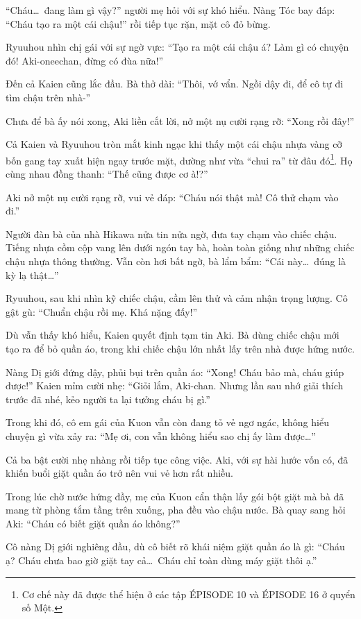 \documentclass[../main.tex]{subfiles}
\begin{document}
``Cháu\dots\ đang làm gì vậy?'' người mẹ hỏi với sự khó hiểu. Nàng Tóc bay đáp: ``Cháu tạo ra một cái chậu!'' rồi tiếp tục rặn, mặt cô đỏ bừng.

Ryuuhou nhìn chị gái với sự ngờ vực: ``Tạo ra một cái chậu á? Làm gì có chuyện đó! Aki-oneechan, đừng có đùa nữa!''

Đến cả Kaien cũng lắc đầu. Bà thở dài: ``Thôi, vớ vẩn. Ngồi dậy đi, để cô tự đi tìm chậu trên nhà-''

Chưa để bà ấy nói xong, Aki liền cắt lời, nở một nụ cười rạng rỡ: ``Xong rồi đây!''

Cả Kaien và Ryuuhou tròn mắt kinh ngạc khi thấy một cái chậu nhựa vàng cỡ bốn gang tay xuất hiện ngay trước mặt, dường như vừa ``chui ra'' từ đâu đó\footnote{Cơ chế này đã được thể hiện ở các tập {\flaregothic ÉPISODE 10} và {\flaregothic ÉPISODE 16} ở quyển số Một.}. Họ cùng nhau đồng thanh: ``Thế cũng được cơ à!?''

Aki nở một nụ cười rạng rỡ, vui vẻ đáp: ``Cháu nói thật mà! Cô thử chạm vào đi.''

Người đàn bà của nhà Hikawa nửa tin nửa ngờ, đưa tay chạm vào chiếc chậu. Tiếng nhựa cồm cộp vang lên dưới ngón tay bà, hoàn toàn giống như những chiếc chậu nhựa thông thường. Vẫn còn hơi bất ngờ, bà lẩm bẩm: ``Cái này\dots\ đúng là kỳ lạ thật\dots''

Ryuuhou, sau khi nhìn kỹ chiếc chậu, cầm lên thử và cảm nhận trọng lượng. Cô gật gù: ``Chuẩn chậu rồi mẹ. Khá nặng đấy!''

Dù vẫn thấy khó hiểu, Kaien quyết định tạm tin Aki. Bà dùng chiếc chậu mới tạo ra để bỏ quần áo, trong khi chiếc chậu lớn nhất lấy trên nhà được hứng nước.

Nàng Dị giới đứng dậy, phủi bụi trên quần áo: ``Xong! Cháu bảo mà, cháu giúp được!'' Kaien mỉm cười nhẹ: ``Giỏi lắm, Aki-chan. Nhưng lần sau nhớ giải thích trước đã nhé, kẻo người ta lại tưởng cháu bị gì.''

Trong khi đó, cô em gái của Kuon vẫn còn đang tỏ vẻ ngơ ngác, không hiểu chuyện gì vừa xảy ra: ``Mẹ ơi, con vẫn không hiểu sao chị ấy làm được\dots''

Cả ba bật cười nhẹ nhàng rồi tiếp tục công việc. Aki, với sự hài hước vốn có, đã khiến buổi giặt quần áo trở nên vui vẻ hơn rất nhiều.

Trong lúc chờ nước hứng đầy, mẹ của Kuon cẩn thận lấy gói bột giặt mà bà đã mang từ phòng tắm tầng trên xuống, pha đều vào chậu nước. Bà quay sang hỏi Aki: ``Cháu có biết giặt quần áo không?''

Cô nàng Dị giới nghiêng đầu, dù cô biết rõ khái niệm giặt quần áo là gì: ``Cháu ạ? Cháu chưa bao giờ giặt tay cả\dots\ Cháu chỉ toàn dùng máy giặt thôi ạ.''
\end{document}

